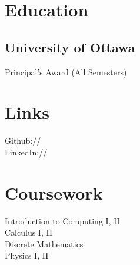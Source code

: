 \documentclass[]{resume-openfont}
\begin{document}
%
%



%
%

\begin{minipage}[t]{0.33\textwidth} 


\section{Education} 

\subsection{University of Ottawa}
\sectionsep


Principal's Award (All Semesters) \\
\sectionsep



\section{Links} 
Github:// \href{https://https://github.com/Suri111200}{} \\
LinkedIn://  \href{https://www.linkedin.com/in/soorya-s}{} \\
\sectionsep


\section{Coursework}
Introduction to Computing I, II\\
Calculus I, II \\
Discrete Mathematics \\
Physics I, II \\
\sectionsep


\end{minipage}
\end{document}
